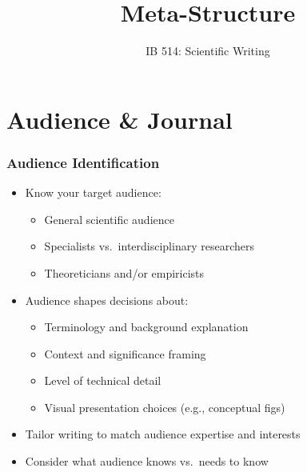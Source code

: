 \documentclass{beamer}
\title{Meta-Structure}
\author[]{IB 514: Scientific Writing}
\date[]{}
\begin{document}
\begin{frame}
  \titlepage
\end{frame}

\section{Audience \& Journal}

\begin{frame}
  \frametitle{Audience Identification}
  \begin{itemize}
    \item Know your target audience:
    \begin{itemize}
      \item General scientific audience
      \item Specialists vs.\ interdisciplinary researchers
      \item Theoreticians and/or empiricists
    \end{itemize}
    \item Audience shapes decisions about:
    \begin{itemize}
      \item Terminology and background explanation
      \item Context and significance framing
      \item Level of technical detail
      \item Visual presentation choices (e.g., conceptual figs)
    \end{itemize}
    \item Tailor writing to match audience expertise and interests
    \item Consider what audience knows vs.\ needs to know
  \end{itemize}
\end{frame}
\end{document}
